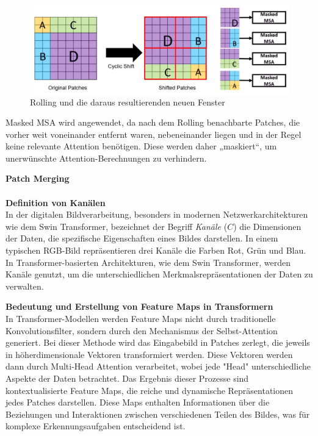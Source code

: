 \documentclass[12pt,a4paper,twoside]{article}
\newcommand{\smallbold}[1]{\noindent\textbf{\small #1}}
\begin{document}
\begin{figure}[H]
    \centering
    \includegraphics[width=0.7\linewidth]{SWIN-Transformer-SWMSA.png}
    \caption{Rolling und die daraus resultierenden neuen Fenster}
    \label{fig:swmsa}
\end{figure}

Masked MSA wird angewendet, da nach dem Rolling benachbarte Patches, die vorher weit voneinander entfernt waren, nebeneinander liegen und in der Regel keine relevante Attention benötigen. Diese werden daher „maskiert“, um unerwünschte Attention-Berechnungen zu verhindern.

\textbf{Patch Merging}\\\\
\smallbold{Definition von Kanälen}\\
In der digitalen Bildverarbeitung, besonders in modernen Netzwerkarchitekturen wie dem Swin Transformer, bezeichnet der Begriff \textit{Kanäle} (\(C\)) die Dimensionen der Daten, die spezifische Eigenschaften eines Bildes darstellen. In einem typischen RGB-Bild repräsentieren drei Kanäle die Farben Rot, Grün und Blau. In Transformer-basierten Architekturen, wie dem Swin Transformer, werden Kanäle genutzt, um die unterschiedlichen Merkmalsrepräsentationen der Daten zu verwalten.

\smallbold{Bedeutung und Erstellung von Feature Maps in Transformern}\\
In Transformer-Modellen werden Feature Maps nicht durch traditionelle Konvolutionsfilter, sondern durch den Mechanismus der Selbst-Attention generiert. Bei dieser Methode wird das Eingabebild in Patches zerlegt, die jeweils in höherdimensionale Vektoren transformiert werden. Diese Vektoren werden dann durch Multi-Head Attention verarbeitet, wobei jede "Head" unterschiedliche Aspekte der Daten betrachtet. Das Ergebnis dieser Prozesse sind kontextualisierte Feature Maps, die reiche und dynamische Repräsentationen jedes Patches darstellen. Diese Maps enthalten Informationen über die Beziehungen und Interaktionen zwischen verschiedenen Teilen des Bildes, was für komplexe Erkennungsaufgaben entscheidend ist.
\end{document}
